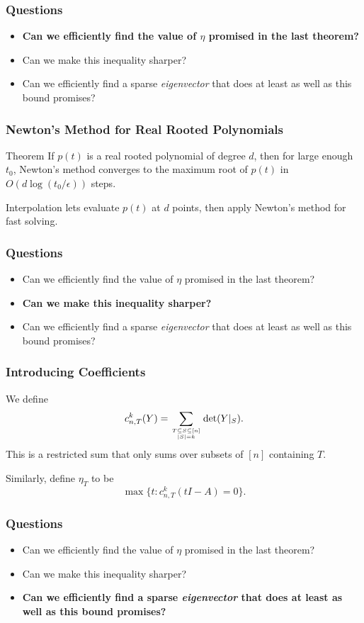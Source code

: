 \documentclass{beamer}
\renewcommand\top[2]{\genfrac{}{}{0pt}{}{#1}{#2}}
\begin{document}
\begin{frame}
    \frametitle{Questions}
    \begin{itemize}
        \item \textbf{Can we efficiently find the value of $\eta$ promised in the last theorem?}
        \item Can we make this inequality sharper?
        \item Can we efficiently find a sparse \emph{eigenvector} that does at least as well as this bound promises?
    \end{itemize}
\end{frame}
\begin{frame}
    \frametitle{Newton's Method for Real Rooted Polynomials}
    \begin{block}{Theorem}
        If $p(t)$ is a real rooted polynomial of degree $d$, then for large enough $t_0$, Newton's method converges to the maximum root of $p(t)$ in $O(d \log(t_0 / \epsilon))$ steps.
    \end{block}
    Interpolation lets evaluate $p(t)$ at $d$ points, then apply Newton's method for fast solving.
\end{frame}
\begin{frame}
    \frametitle{Questions}
    \begin{itemize}
        \item Can we efficiently find the value of $\eta$ promised in the last theorem?
        \item \textbf{Can we make this inequality sharper?}
        \item Can we efficiently find a sparse \emph{eigenvector} that does at least as well as this bound promises?
    \end{itemize}
\end{frame}
\begin{frame}
    \frametitle{Introducing Coefficients}
    We define 
    \[
        c_{n,T}^k(Y) = \sum_{\top{T \subseteq S \subseteq [n]}{|S| = k}}  \det(Y|_S).
    \]
    This is a restricted sum that only sums over subsets of $[n]$ containing $T$.

    Similarly, define $\eta_T$ to be 
    \[
        \max \{ t : c_{n,T}^k(tI - A) = 0\}.
    \]
\end{frame}
\begin{frame}
    \frametitle{Questions}
    \begin{itemize}
        \item Can we efficiently find the value of $\eta$ promised in the last theorem?
        \item Can we make this inequality sharper?
        \item \textbf{Can we efficiently find a sparse \emph{eigenvector} that does at least as well as this bound promises?}
    \end{itemize}
\end{frame}
\end{document}
